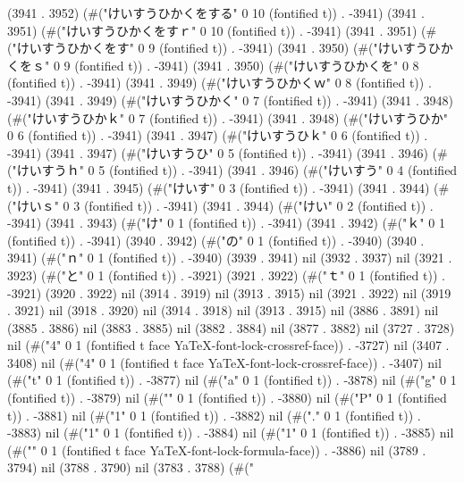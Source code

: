 (3941 . 3952) (#("けいすうひかくをする" 0 10 (fontified t)) . -3941) (3941 . 3951) (#("けいすうひかくをすｒ" 0 10 (fontified t)) . -3941) (3941 . 3951) (#("けいすうひかくをす" 0 9 (fontified t)) . -3941) (3941 . 3950) (#("けいすうひかくをｓ" 0 9 (fontified t)) . -3941) (3941 . 3950) (#("けいすうひかくを" 0 8 (fontified t)) . -3941) (3941 . 3949) (#("けいすうひかくｗ" 0 8 (fontified t)) . -3941) (3941 . 3949) (#("けいすうひかく" 0 7 (fontified t)) . -3941) (3941 . 3948) (#("けいすうひかｋ" 0 7 (fontified t)) . -3941) (3941 . 3948) (#("けいすうひか" 0 6 (fontified t)) . -3941) (3941 . 3947) (#("けいすうひｋ" 0 6 (fontified t)) . -3941) (3941 . 3947) (#("けいすうひ" 0 5 (fontified t)) . -3941) (3941 . 3946) (#("けいすうｈ" 0 5 (fontified t)) . -3941) (3941 . 3946) (#("けいすう" 0 4 (fontified t)) . -3941) (3941 . 3945) (#("けいす" 0 3 (fontified t)) . -3941) (3941 . 3944) (#("けいｓ" 0 3 (fontified t)) . -3941) (3941 . 3944) (#("けい" 0 2 (fontified t)) . -3941) (3941 . 3943) (#("け" 0 1 (fontified t)) . -3941) (3941 . 3942) (#("ｋ" 0 1 (fontified t)) . -3941) (3940 . 3942) (#("の" 0 1 (fontified t)) . -3940) (3940 . 3941) (#("ｎ" 0 1 (fontified t)) . -3940) (3939 . 3941) nil (3932 . 3937) nil (3921 . 3923) (#("と" 0 1 (fontified t)) . -3921) (3921 . 3922) (#("ｔ" 0 1 (fontified t)) . -3921) (3920 . 3922) nil (3914 . 3919) nil (3913 . 3915) nil (3921 . 3922) nil (3919 . 3921) nil (3918 . 3920) nil (3914 . 3918) nil (3913 . 3915) nil (3886 . 3891) nil (3885 . 3886) nil (3883 . 3885) nil (3882 . 3884) nil (3877 . 3882) nil (3727 . 3728) nil (#("4" 0 1 (fontified t face YaTeX-font-lock-crossref-face)) . -3727) nil (3407 . 3408) nil (#("4" 0 1 (fontified t face YaTeX-font-lock-crossref-face)) . -3407) nil (#("t" 0 1 (fontified t)) . -3877) nil (#("a" 0 1 (fontified t)) . -3878) nil (#("g" 0 1 (fontified t)) . -3879) nil (#("{" 0 1 (fontified t)) . -3880) nil (#("P" 0 1 (fontified t)) . -3881) nil (#("1" 0 1 (fontified t)) . -3882) nil (#("." 0 1 (fontified t)) . -3883) nil (#("1" 0 1 (fontified t)) . -3884) nil (#("1" 0 1 (fontified t)) . -3885) nil (#("}" 0 1 (fontified t face YaTeX-font-lock-formula-face)) . -3886) nil (3789 . 3794) nil (3788 . 3790) nil (3783 . 3788) (#("
